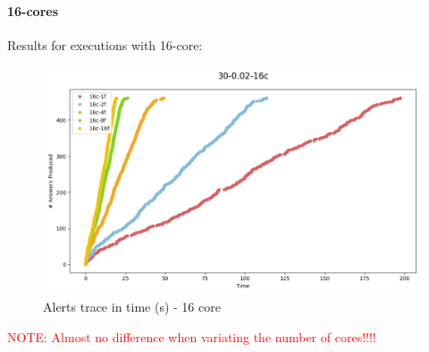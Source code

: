 \paragraph{16-cores\\}

Results for executions with 16-core:

\begin{figure}[H]
  \centering
  \includegraphics[scale = 0.5]{images/4-Experiments/E2/30-0.02-16c/traces.png}
  \caption{Alerts trace in time (s) - 16 core}
\end{figure}

\textcolor{red}{NOTE: Almost no difference when variating the number of cores!!!!}

